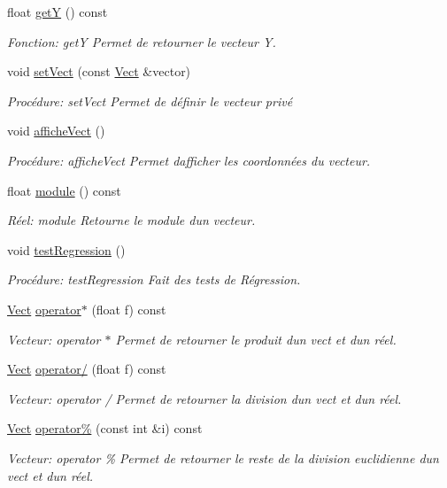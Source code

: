 \begin{DoxyCompactItemize}
float \hyperlink{classVect_a2e44111683aae147cd053ac6002f5992}{getY} () const
\begin{DoxyCompactList}\small\item\em Fonction\+: getY Permet de retourner le vecteur Y. \end{DoxyCompactList}\item 
void \hyperlink{classVect_a28408435bc900905d3416aef70140cd9}{set\+Vect} (const \hyperlink{classVect}{Vect} \&vector)
\begin{DoxyCompactList}\small\item\em Procédure\+: set\+Vect Permet de définir le vecteur privé \end{DoxyCompactList}\item 
void \hyperlink{classVect_afba6ce27d6700dddeb9272cdf39c66e3}{affiche\+Vect} ()
\begin{DoxyCompactList}\small\item\em Procédure\+: affiche\+Vect Permet d\textquotesingle{}afficher les coordonnées du vecteur. \end{DoxyCompactList}\item 
float \hyperlink{classVect_aa61c71b79a4d2f2cda092648a7268c4f}{module} () const
\begin{DoxyCompactList}\small\item\em Réel\+: module Retourne le module d\textquotesingle{}un vecteur. \end{DoxyCompactList}\item 
void \hyperlink{classVect_a734074001bba32f3d76e5cee612864f1}{test\+Regression} ()
\begin{DoxyCompactList}\small\item\em Procédure\+: test\+Regression Fait des tests de Régression. \end{DoxyCompactList}\item 
\hyperlink{classVect}{Vect} \hyperlink{classVect_a81581552ec69c7a0006837148141232e}{operator$\ast$} (float f) const
\begin{DoxyCompactList}\small\item\em Vecteur\+: operator $\ast$ Permet de retourner le produit d\textquotesingle{}un vect et d\textquotesingle{}un réel. \end{DoxyCompactList}\item 
\hyperlink{classVect}{Vect} \hyperlink{classVect_a5fcad4106fa5eb9826f7259f3509599e}{operator/} (float f) const
\begin{DoxyCompactList}\small\item\em Vecteur\+: operator / Permet de retourner la division d\textquotesingle{}un vect et d\textquotesingle{}un réel. \end{DoxyCompactList}\item 
\hyperlink{classVect}{Vect} \hyperlink{classVect_a7c95db0096c212593a83992d8c9cc42a}{operator\%} (const int \&i) const
\begin{DoxyCompactList}\small\item\em Vecteur\+: operator \% Permet de retourner le reste de la division euclidienne d\textquotesingle{}un vect et d\textquotesingle{}un réel. \end{DoxyCompactList}\end{DoxyCompactItemize}


